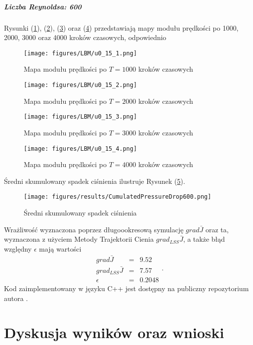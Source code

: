 \documentclass[12pt, twoside]{book}
\begin{document}
\paragraph{Liczba Reynoldsa: 600}
Rysunki (\ref{Fig51}), (\ref{Fig52}), (\ref{Fig53}) oraz (\ref{Fig54}) przedstawiają mapy modułu prędkości po 1000, 2000, 3000 oraz 4000 kroków czasowych, odpowiednio 
\begin{figure}[H]
	\texttt{[image: figures/LBM/u0\_15\_1.png]} 
	\caption{Mapa modułu prędkości po $ T=1000 $ kroków czasowych}
	\label{Fig51}
\end{figure}
\begin{figure}[H]
	\texttt{[image: figures/LBM/u0\_15\_2.png]} 
	\caption{Mapa modułu prędkości po $ T=2000 $ kroków czasowych}
	\label{Fig52}
\end{figure}
\begin{figure}[H]
	\texttt{[image: figures/LBM/u0\_15\_3.png]} 
	\caption{Mapa modułu prędkości po $ T=3000 $ kroków czasowych}
	\label{Fig53}
\end{figure}
\begin{figure}[H]
	\texttt{[image: figures/LBM/u0\_15\_4.png]} 
	\caption{Mapa modułu prędkości po $ T=4000 $ kroków czasowych}
	\label{Fig54}
\end{figure}
Średni skumulowany spadek ciśnienia ilustruje Rysunek (\ref{Fig55}).
\begin{figure}[H]
	\texttt{[image: figures/results/CumulatedPressureDrop600.png]} 
	\centering
	\caption{Średni skumulowany spadek ciśnienia}
	\label{Fig55}
\end{figure}
Wrażliwość wyznaczona poprzez długoookresową symulację $ grad\bar{J} $ oraz ta, wyznaczona z użyciem Metody Trajektorii Cienia $ grad_{LSS}\bar{J} $, a także błąd względny $ \epsilon $ mają wartości
\begin{equation}
\begin{array}{rcl}
grad\bar{J} &=& 9.52 \\
grad_{LSS}\bar{J} &=& 7.57 \\ 
\epsilon &=& 0.2048
\end{array}.
\label{result600}
\end{equation}
Kod zaimplementowany w języku C++ jest dostępny na publiczny repozytorium autora \cite{Marek2}.
\newpage
\chapter{Dyskusja wyników oraz wnioski}
\end{document}

